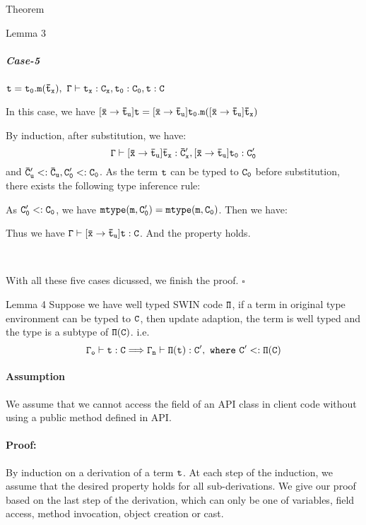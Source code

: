\documentclass[GBK,winfonts,a4paper,11pt]{article}
\begin{document}
\begin{section}{Theorem}
\begin{subsection}{Lemma 3}
\subparagraph{Case-5} $\tt t=t_0.m(\bar{t}_x),\ \Gamma\vdash t_x:C_x, t_0:C_0, t:C$
\par
In this case, we have $\tt [\bar{x}\rightarrow\bar{t}_u]t=[\bar{x}\rightarrow\bar{t}_u]t_0.m([\bar{x}\rightarrow\bar{t}_u]\bar{t}_x)$
\par
By induction, after substitution, we have: $$\tt \Gamma\vdash [\bar{x}\rightarrow\bar{t}_u]\bar{t}_x:\bar{C}'_x,[\bar{x}\rightarrow\bar{t}_u]t_0:C'_0$$ and $\tt \bar{C}'_u<:\bar{C}_u, C'_0<:C_0$. 
As the term $\tt t$ can be typed to $\tt C_0$ before substitution, there exists the following type inference rule:
\begin{center}
\DP
\end{center}
As $\tt C'_0 <: C_0$, we have $\tt mtype(m,C'_0)=mtype(m, C_0)$. Then we have:
\begin{center}
\DP
\end{center}
Thus we have $\tt \Gamma\vdash [\bar{x}\rightarrow\bar{t}_u]t:C$. And the property holds.
\par
\ 
\par
With all these five cases dicussed, we finish the proof. $\square$
\end{subsection}

\begin{subsection}{Lemma 4}
Suppose we have well typed SWIN code $\tt \Pi$, if a term in original type environment can be typed to $\tt C$, then update adaption, the term is well typed and the type is a subtype of $\tt \Pi(C)$. i.e.
$$\tt \Gamma_o\vdash t:C \Longrightarrow \Gamma_n\vdash \Pi(t):C',\ where\ C'<:\Pi(C)$$
\paragraph{Assumption} We assume that we cannot access the field of an API class in client code without using a public method defined in API.
\paragraph{Proof:}
By induction on a derivation of a term $\tt t$. At each step of the induction, we assume that the desired property holds for all sub-derivations.
We give our proof based on the last step of the derivation, which can only be one of variables, field access, method invocation, object creation or cast.

\end{subsection}
\end{section}
\end{document}
